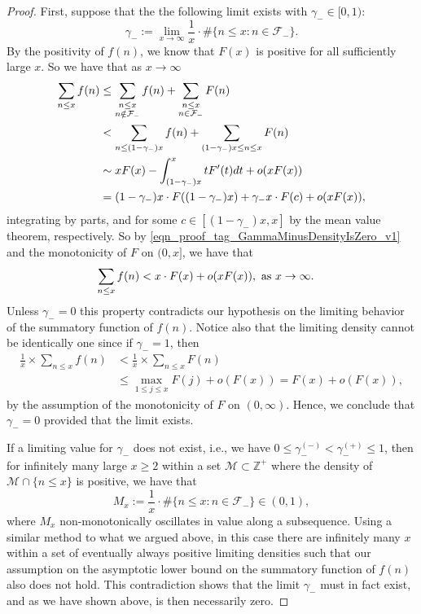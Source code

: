 \documentclass[11pt,reqno,a4letter]{article}
\numberwithin{figure}{section}
\numberwithin{table}{section}
\theoremstyle{plain}
\numberwithin{theorem}{section}
\theoremstyle{definition}
\begin{document}
\begin{proof} 
First, suppose that the the following limit exists with $\gamma_{-} \in [0, 1)$: 
\[
\gamma_{-} := \lim_{x \rightarrow \infty} \frac{1}{x} \cdot \#\{n \leq x: n \in \mathcal{F}_{-}\}. 
\]
By the positivity of $f(n)$, we know that $F(x)$ is positive for all sufficiently large $x$. 
So we have that as $x \rightarrow \infty$ 
\begin{align} 
\notag 
\sum_{n \leq x} f(n) & \leq \sum_{\substack{n \leq x \\ n \notin \mathcal{F}_{-}}} f(n) + 
     \sum_{\substack{n \leq x \\ n \in \mathcal{F}_{-}}} F(n) \\ 
\notag 
     & < \sum_{n \leq (1-\gamma_{-}) x} f(n) + 
     \sum_{(1-\gamma_{-}) x \leq n \leq x} F(n) \\ 
\notag 
     & \sim 
     x F(x) - \int_{(1-\gamma_{-}) x}^{x} t F^{\prime}(t) dt +o(xF(x)) \\ 
\label{eqn_proof_tag_GammaMinusDensityIsZero_v1} 
     & = (1-\gamma_{-}) x \cdot F((1-\gamma_{-}) x) + \gamma_{-} x \cdot F(c) + o(xF(x)), 
\end{align} 
integrating by parts, and for some $c \in [(1-\gamma_{-}) x, x]$ by the mean value theorem, respectively. 
So by \eqref{eqn_proof_tag_GammaMinusDensityIsZero_v1} and the monotonicity of $F$ on $(0, x]$, we have that 
\begin{align} 
\notag 
\sum_{n \leq x} f(n) & < x \cdot F(x) + o(xF(x)), 
     \mathrm{\ as\ } x \rightarrow \infty. 
\end{align} 
Unless $\gamma_{-} = 0$ this property contradicts our hypothesis on the limiting behavior 
of the summatory function of $f(n)$. 
Notice also that the limiting density cannot be identically one since if $\gamma_{-} = 1$, then 
\begin{align*} 
\frac{1}{x} \times \sum_{n \leq x} f(n) & < \frac{1}{x} \times \sum_{n \leq x} F(n) \\ 
     & \leq \max_{1 \leq j \leq x} F(j) + o(F(x)) = F(x) + o(F(x)), 
\end{align*} 
by the assumption of the monotonicity of $F$ on $(0, \infty)$. 
Hence, we conclude that $\gamma_{-} = 0$ provided that the limit exists. 

If a limiting value for $\gamma_{-}$ does not exist, i.e., we have 
$0 \leq \gamma_{-}^{(-)} < \gamma_{-}^{(+)} \leq 1$, 
then for infinitely many large $x \geq 2$ within 
a set $\mathcal{M} \subset \mathbb{Z}^{+}$ where the density of 
$\mathcal{M} \cap \{n \leq x\}$ is positive, we have that 
\[
M_x := \frac{1}{x} \cdot \#\{n \leq x: n \in \mathcal{F}_{-}\} \in (0, 1), 
\]
where $M_x$ non-monotonically oscillates in value along a subsequence. 
Using a similar method to what we argued above, in this case there are infinitely many $x$ within a set of 
eventually always positive limiting densities such that 
our assumption on the asymptotic lower bound on 
the summatory function of $f(n)$ also does not hold. 
This contradiction shows that the limit $\gamma_{-}$ 
must in fact exist, and as we have shown above, is then necessarily zero. 
\end{proof} 
\end{document}
